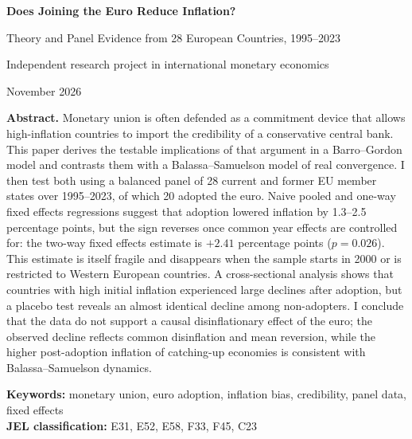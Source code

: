 \documentclass[11pt,a4paper]{article}
\numberwithin{equation}{section}
\theoremstyle{definition}
\theoremstyle{remark}
\begin{document}
\begin{titlepage}
\centering
\vspace*{3cm}
{\Large\bfseries Does Joining the Euro Reduce Inflation?\par}
\vspace{0.6cm}
{\large Theory and Panel Evidence from 28 European Countries, 1995--2023\par}
\vspace{2.5cm}
{\normalsize Independent research project in international monetary economics\par}
\vspace{0.4cm}
{\normalsize November 2026\par}
\vfill
\begin{minipage}{0.82\linewidth}
\small
\textbf{Abstract.} Monetary union is often defended as a commitment device that allows high-inflation countries to import the credibility of a conservative central bank. This paper derives the testable implications of that argument in a Barro--Gordon model and contrasts them with a Balassa--Samuelson model of real convergence. I then test both using a balanced panel of 28 current and former EU member states over 1995--2023, of which 20 adopted the euro. Naive pooled and one-way fixed effects regressions suggest that adoption lowered inflation by 1.3--2.5 percentage points, but the sign reverses once common year effects are controlled for: the two-way fixed effects estimate is $+2.41$ percentage points ($p=0.026$). This estimate is itself fragile and disappears when the sample starts in 2000 or is restricted to Western European countries. A cross-sectional analysis shows that countries with high initial inflation experienced large declines after adoption, but a placebo test reveals an almost identical decline among non-adopters. I conclude that the data do not support a causal disinflationary effect of the euro; the observed decline reflects common disinflation and mean reversion, while the higher post-adoption inflation of catching-up economies is consistent with Balassa--Samuelson dynamics.

\medskip
\textbf{Keywords:} monetary union, euro adoption, inflation bias, credibility, panel data, fixed effects\\
\textbf{JEL classification:} E31, E52, E58, F33, F45, C23
\end{minipage}
\vspace{1.5cm}
\end{titlepage}
\end{document}
